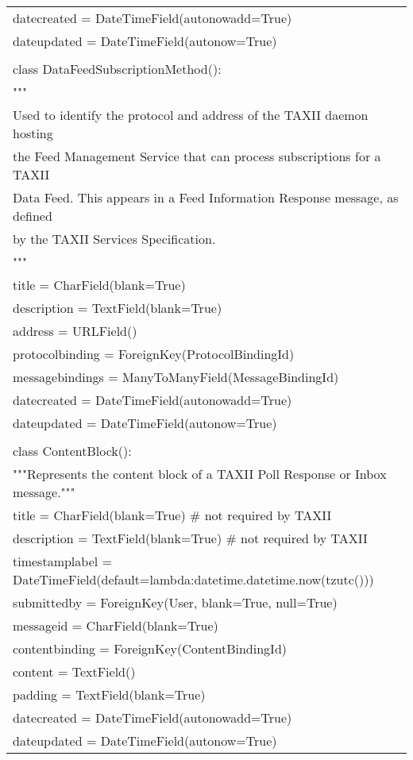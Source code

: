 \begin{center}
\begin{longtable}{|l|}
	    datecreated = DateTimeField(autonowadd=True)\\
	    dateupdated = DateTimeField(autonow=True)\\
	\\
	class DataFeedSubscriptionMethod():\\
	    """\\
	    Used to identify the protocol and address of the TAXII daemon hosting\\
	    the Feed Management Service that can process subscriptions for a TAXII\\
	    Data Feed. This appears in a Feed Information Response message, as defined\\
	    by the TAXII Services Specification.\\
	    """\\
	    title = CharField(blank=True)\\
	    description = TextField(blank=True)\\
	    address = URLField()\\
	    protocolbinding = ForeignKey(ProtocolBindingId)\\
	    messagebindings = ManyToManyField(MessageBindingId)\\
	    datecreated = DateTimeField(autonowadd=True)\\
	    dateupdated = DateTimeField(autonow=True)\\
	\\
	class ContentBlock():\\
	    """Represents the content block of a TAXII Poll Response or Inbox message."""\\
	    title = CharField(blank=True) \# not required by TAXII\\
	    description = TextField(blank=True) \# not required by TAXII\\
	    timestamplabel = DateTimeField(default=lambda:datetime.datetime.now(tzutc()))\\
	    submittedby = ForeignKey(User, blank=True, null=True)\\
	    messageid = CharField(blank=True)\\
	    contentbinding = ForeignKey(ContentBindingId)\\
	    content = TextField()\\
	    padding = TextField(blank=True)\\
	    datecreated = DateTimeField(autonowadd=True)\\
	    dateupdated = DateTimeField(autonow=True)\\

\end{longtable}
\end{center}
